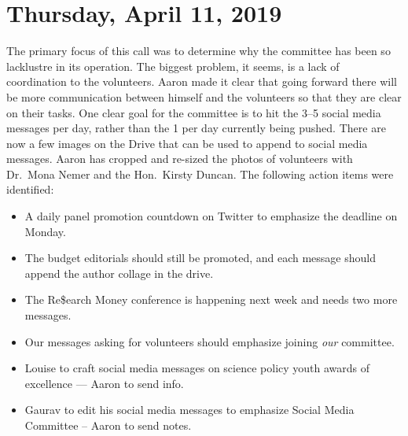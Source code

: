 \documentclass[12pt]{amsart}
\begin{document}
\section{Thursday, April 11, 2019}\label{mgt04}%
The primary focus of this call was to determine why the committee has been so lacklustre in its operation.
The biggest problem, it seems, is a lack of coordination to the volunteers.
Aaron made it clear that going forward there will be more communication between himself and the volunteers so that they are clear on their tasks.
One clear goal for the committee is to hit the 3--5 social media messages per day, rather than the 1 per day currently being pushed.
There are now a few images on the Drive that can be used to append to social media messages.
Aaron has cropped and re-sized the photos of volunteers with Dr.~Mona Nemer and the Hon.~Kirsty Duncan.
The following action items were identified:
\begin{itemize}
\item A daily panel promotion countdown on Twitter to emphasize the deadline on Monday.
\item The budget editorials should still be promoted, and each message should append the author collage in the drive.
\item The Re\$earch Money conference is happening next week and needs two more messages.
\item Our messages asking for volunteers should emphasize joining \emph{our} committee.
\item Louise to craft social media messages on science policy youth awards of excellence --- Aaron to send info.
\item Gaurav to edit his social media messages to emphasize Social Media Committee -- Aaron to send notes.
\end{itemize}
\end{document}

